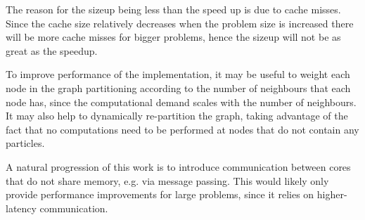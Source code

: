 The reason for the sizeup being less than the speed up is due to cache misses. Since the cache size relatively decreases when the problem size is increased there will be more cache misses for bigger problems, hence the sizeup will not be as great as the speedup. 

To improve performance of the implementation, it may be useful to weight each node in the graph partitioning according to the number of neighbours that each node has, since the computational demand scales with the number of neighbours. It may also help to dynamically re-partition the graph, taking advantage of the fact that no computations need to be performed at nodes that do not contain any particles. 

A natural progression of this work is to introduce communication between cores that do not share memory, e.g. via message passing. This would likely only provide performance improvements for large problems, since it relies on higher-latency communication.